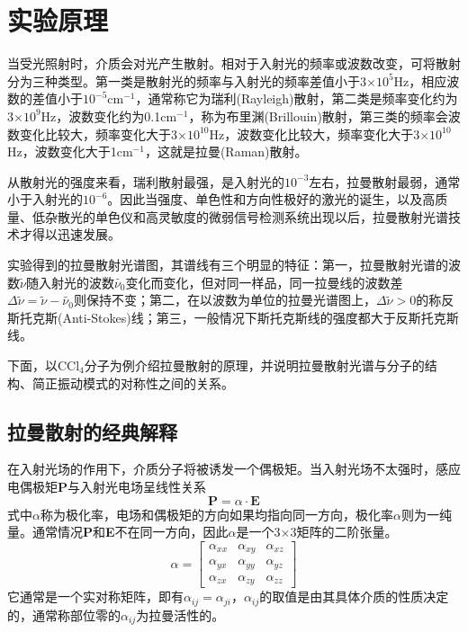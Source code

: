\documentclass[a4paper]{article}
\begin{document}
\section{实验原理}
当受光照射时，介质会对光产生散射。相对于入射光的频率或波数改变，可将散射分为三种类型。第一类是散射光的频率与入射光的频率差值小于3$\times 10^{5}$Hz，相应波数的差值小于$10^{-5}\text{cm}^{-1}$，通常称它为瑞利(Rayleigh)散射，第二类是频率变化约为3$\times 10^{9}$Hz，波数变化约为0.1cm$^{-1}$，称为布里渊(Brillouin)散射，第三类的频率会波数变化比较大，频率变化大于3$\times 10^{10}$Hz，波数变化比较大，频率变化大于3$\times 10^{10}$Hz，波数变化大于1cm$^{-1}$，这就是拉曼(Raman)散射。

从散射光的强度来看，瑞利散射最强，是入射光的$10^{-3}$左右，拉曼散射最弱，通常小于入射光的$10^{-6}$。因此当强度、单色性和方向性极好的激光的诞生，以及高质量、低杂散光的单色仪和高灵敏度的微弱信号检测系统出现以后，拉曼散射光谱技术才得以迅速发展。

实验得到的拉曼散射光谱图，其谱线有三个明显的特征：第一，拉曼散射光谱的波数$\widetilde{\nu}$随入射光的波数$\widetilde{\nu_0}$变化而变化，但对同一样品，同一拉曼线的波数差$\Delta\widetilde{\nu} = \widetilde{\nu} - \widetilde{\nu_0}$则保持不变；第二，在以波数为单位的拉曼光谱图上，$\Delta\widetilde{\nu}>0$的称反斯托克斯(Anti-Stokes)线；第三，一般情况下斯托克斯线的强度都大于反斯托克斯线。

下面，以$\text{CCl}_4$分子为例介绍拉曼散射的原理，并说明拉曼散射光谱与分子的结构、简正振动模式的对称性之间的关系。
\subsection{拉曼散射的经典解释}
在入射光场的作用下，介质分子将被诱发一个偶极矩。当入射光场不太强时，感应电偶极矩\textbf{P}与入射光电场呈线性关系
\begin{equation}
\textbf{P} = \alpha\cdot \textbf{E}\label{eq1}
\end{equation}
式中$\alpha$称为极化率，电场和偶极矩的方向如果均指向同一方向，极化率$\alpha$则为一纯量。通常情况\textbf{P}和\textbf{E}不在同一方向，因此\textbf{$\alpha$}是一个3$\times$3矩阵的二阶张量。
\begin{equation}
\textbf{$\alpha$} = 
\begin{bmatrix}
\alpha_{xx} & \alpha_{xy} & \alpha_{xz}\\
\alpha_{yx} & \alpha_{yy} & \alpha_{yz}\\
\alpha_{zx} & \alpha_{zy} & \alpha_{zz}
\end{bmatrix}\label{eq2}
\end{equation}
它通常是一个实对称矩阵，即有$\alpha_{ij} = \alpha_{ji}$，$\alpha_{ij}$的取值是由其具体介质的性质决定的，通常称部位零的$\alpha_{ij}$为拉曼活性的。
\end{document}
